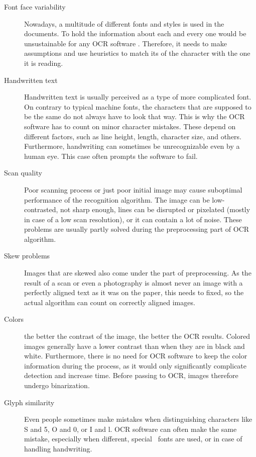 \begin{description}
\item[Font face variability] Nowadays, a multitude of different fonts and styles is used in the documents. To hold the information about each and every one would be unsustainable for any OCR software . Therefore, it needs to make assumptions and use heuristics to match its  of the character  with the one it is reading.
\item[Handwritten text] Handwritten text is usually perceived as a type of more complicated font. On contrary to typical machine fonts, the characters that are supposed to be the same do not always have to look that way. This is why the OCR software has to count on minor character mistakes. These depend on different factors, such as line height, length, character size, and others. Furthermore, handwriting can sometimes be unrecognizable even by a human eye. This case often prompts the software to fail.
\item[Scan quality] Poor scanning process or just poor initial image may cause suboptimal performance of the recognition algorithm. The image can be low-contrasted, not sharp enough, lines can be disrupted or pixelated (mostly in case of a low scan resolution), or it can contain a lot of noise. These problems are usually partly solved during the preprocessing part of OCR algorithm.
\item[Skew problems] Images that are skewed also come under the part of preprocessing. As the result of a scan or even a photography is almost never an image with a perfectly aligned text as it was on the paper, this needs to fixed, so the actual algorithm can count on correctly aligned images.
\item[Colors]  the better the contrast of the image, the better the OCR results. Colored images generally have a lower contrast than when they are in black and white. Furthermore, there is no need for OCR software to keep the color information during the process, as it would only significantly complicate detection and increase time. Before passing to OCR, images therefore undergo binarization.
\item[Glyph similarity] Even people sometimes make  mistakes when distinguishing characters like S and 5, O and 0, or I and l. OCR software can often make the same mistake, especially when different, special~ fonts are used, or in case of handling handwriting.

\end{description}
